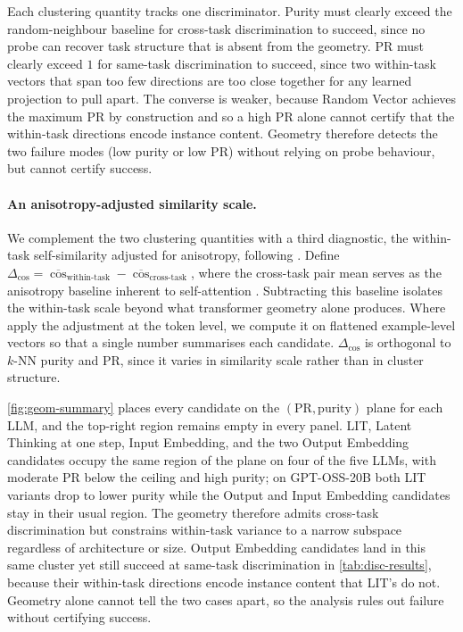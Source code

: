 Each clustering quantity tracks one discriminator. Purity must clearly exceed the random-neighbour baseline for cross-task discrimination to succeed, since no probe can recover task structure that is absent from the geometry. $\mathrm{PR}$ must clearly exceed $1$ for same-task discrimination to succeed, since two within-task vectors that span too few directions are too close together for any learned projection to pull apart. The converse is weaker, because Random Vector achieves the maximum $\mathrm{PR}$ by construction and so a high $\mathrm{PR}$ alone cannot certify that the within-task directions encode instance content. Geometry therefore detects the two failure modes (low purity or low $\mathrm{PR}$) without relying on probe behaviour, but cannot certify success.

\paragraph{An anisotropy-adjusted similarity scale.}
We complement the two clustering quantities with a third diagnostic, the within-task self-similarity adjusted for anisotropy, following \citet{ethayarajh2019contextual}. Define $\Delta_{\cos} = \overline{\cos}_{\text{within-task}} - \overline{\cos}_{\text{cross-task}}$, where the cross-task pair mean serves as the anisotropy baseline inherent to self-attention \citep{godey2024anisotropy}. Subtracting this baseline isolates the within-task scale beyond what transformer geometry alone produces. Where \citet{ethayarajh2019contextual} apply the adjustment at the token level, we compute it on flattened example-level vectors so that a single number summarises each candidate. $\Delta_{\cos}$ is orthogonal to $k$-NN purity and $\mathrm{PR}$, since it varies in similarity scale rather than in cluster structure.



\cref{fig:geom-summary} places every candidate on the $(\mathrm{PR}, \text{purity})$ plane for each LLM, and the top-right region remains empty in every panel. LIT, Latent Thinking at one step, Input Embedding, and the two Output Embedding candidates occupy the same region of the plane on four of the five LLMs, with moderate $\mathrm{PR}$ below the ceiling and high purity; on GPT-OSS-20B both LIT variants drop to lower purity while the Output and Input Embedding candidates stay in their usual region. The geometry therefore admits cross-task discrimination but constrains within-task variance to a narrow subspace regardless of architecture or size. Output Embedding candidates land in this same cluster yet still succeed at same-task discrimination in \cref{tab:disc-results}, because their within-task directions encode instance content that LIT's do not. Geometry alone cannot tell the two cases apart, so the analysis rules out failure without certifying success.

